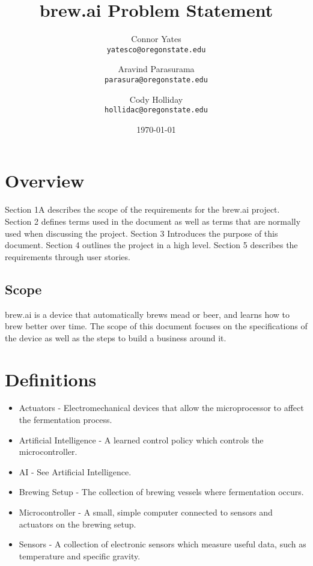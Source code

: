 \documentclass[draftclsnofoot,onecolumn,letterpaper,10pt]{IEEEtran}
\author{Connor Yates\\
\texttt{yatesco@oregonstate.edu\\}
\and
Aravind Parasurama\\
\texttt{parasura@oregonstate.edu\\}
\and
Cody Holliday\\
\texttt{hollidac@oregonstate.edu\\}}
\date{\today}
\title{brew.ai Problem Statement}
\begin{document}
\maketitle

\newpage
\tableofcontents
\newpage
\section{Overview}
Section 1A describes the scope of the requirements for the brew.ai project.
Section 2 defines terms used in the document as well as terms that are normally used when discussing the project.
Section 3 Introduces the purpose of this document.
Section 4 outlines the project in a high level.
Section 5 describes the requirements through user stories.

\subsection{Scope}
brew.ai is a device that automatically brews mead or beer, and learns how to brew better over time.
The scope of this document focuses on the specifications of the device as well 
as the steps to build a business around it.

\section{Definitions}
\begin{itemize}
	\item Actuators - Electromechanical devices that allow the microprocessor to 
		affect the fermentation process.
	\item Artificial Intelligence - A learned control policy which controls 
		the microcontroller.
	\item AI - See Artificial Intelligence.
	\item Brewing Setup - The collection of brewing vessels where fermentation 
		occurs.
	\item Microcontroller - A small, simple computer connected to sensors and 
		actuators on the brewing setup.
	\item Sensors - A collection of electronic sensors which measure useful data, 
		such as temperature and specific gravity.
\end{itemize}
\end{document}
